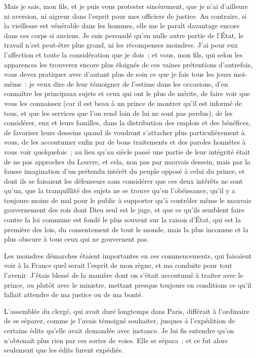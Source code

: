 \documentclass[french,twoside]{book} %
\begin{document}
Mais je sais, mon fils, et je puis vous protester sincèrement, que je n’ai d’ailleurs ni aversion, ni aigreur dans l’esprit pour mes officiers de justice. Au contraire, si la vieillesse est vénérable dans les hommes, elle me le paraît davantage encore dans ces corps si anciens. Je suis persuadé qu’en nulle autre partie de l’État, le travail n’est peut-être plus grand, ni les récompenses moindres. J’ai pour eux l’affection et toute la considération que je dois ; et vous, mon fils, qui selon les apparences les trouverez encore plus éloignés de ces vaines prétentions d’autrefois, vous devez pratiquer avec d’autant plus de soin ce que je fais tous les jours moi-même : je veux dire de leur témoigner de l’estime dans les occasions, d’en connaître les principaux sujets et ceux qui ont le plus de mérite, de faire voir que vous les connaissez (car il est beau à un prince de montrer qu’il est informé de tous, et que les services que l’on rend loin de lui ne sont pas perdus), de les considérer, eux et leurs familles, dans la distribution des emplois et des bénéfices, de favoriser leurs desseins quand ils voudront s’attacher plus particulièrement à vous, de les accoutumer enfin par de bons traitements et des paroles honnêtes à vous voir quelquefois ; au lieu qu’au siècle passé une partie de leur intégrité était de ne pas approcher du Louvre, et cela, non pas par mauvais dessein, mais par la fausse imagination d’un prétendu intérêt du peuple opposé à celui du prince, et dont ils se faisaient les défenseurs sans considérer que ces deux intérêts ne sont qu’un, que la tranquillité des sujets ne se trouve qu’en l’obéissance, qu’il y a toujours moins de mal pour le public à supporter qu’à contrôler même le mauvais gouvernement des rois dont Dieu seul est le juge, et que ce qu’ils semblent faire contre la loi commune est fondé le plus souvent sur la raison d’État, qui est la première des lois, du consentement de tout le monde, mais la plus inconnue et la plus obscure à tous ceux qui ne gouvernent pas.\par
Les moindres démarches étaient importantes en ces commencements, qui faisaient voir à la France quel serait l’esprit de mon règne, et ma conduite pour tout l’avenir. J’étais blessé de la manière dont on s’était accoutumé à traiter avec le prince, ou plutôt avec le ministre, mettant presque toujours en conditions ce qu’il fallait attendre de ma justice ou de ma bonté.\par
L’assemblée du clergé, qui avait duré longtemps dans Paris, différait à l’ordinaire de se séparer, comme je l’avais témoigné souhaiter, jusques à l’expédition de certains édits qu’elle avait demandée avec instance. Je lui fis entendre qu’on n’obtenait plus rien par ces sortes de voies. Elle se sépara ; et ce fut alors seulement que les édits furent expédiés.\par
\end{document}

